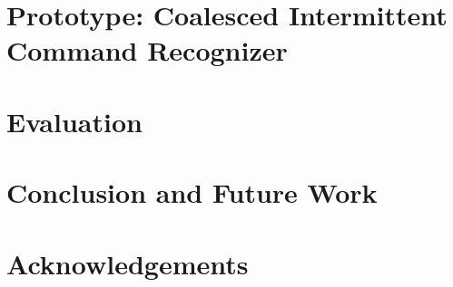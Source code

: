 \documentclass[sigconf]{acmart}
\newcommand{\todo}[1]{}
\renewcommand{\todo}[1]{{\color{red} [{#1}]}}
\begin{document}
\section{Prototype: Coalesced Intermittent Command Recognizer}
\label{sec:disMic}


\section{Evaluation}
\label{sec:evaluation}



% 




\section{Conclusion and Future Work}


\section{Acknowledgements}





\end{document}
